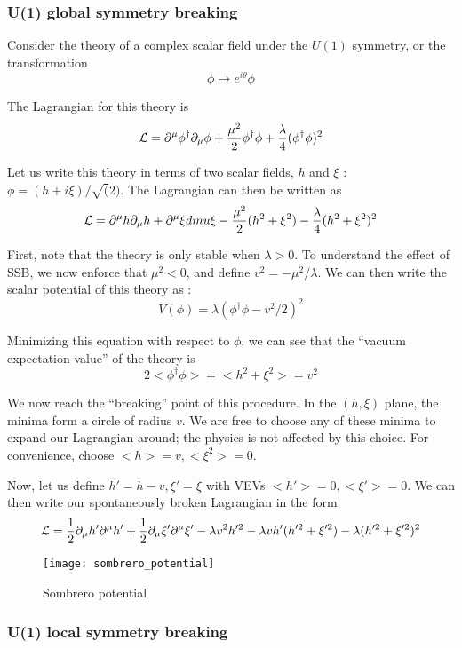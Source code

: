 \subsubsection{U(1) global symmetry breaking}

Consider the theory of a complex scalar field under the $U(1)$ symmetry, or the transformation
\begin{equation}
\phi \rightarrow e^{i\theta} \phi
\end{equation}

The Lagrangian for this theory is
\begin{equation}
\mathcal{L} = \partial^\mu \phi^{\dag} \partial_\mu \phi + \frac{\mu^2}{2} \phi^{\dag} \phi + \frac{\lambda}{4} (\phi^\dag \phi)^2
\end{equation}

Let us write this theory in terms of two scalar fields, $h$ and $\xi$ : $\phi = (h + i\xi) / \sqrt(2)$.
The Lagrangian can then be written as
\begin{equation}
\mathcal{L} = \partial^\mu h \partial_\mu h + \partial^\mu \xi dmu \xi - \frac{\mu^2}{2} (h^2 + \xi^2) - \frac{\lambda}{4}(h^2 + \xi^2)^2
\end{equation}

First, note that the theory is only stable when $\lambda > 0$.
To understand the effect of SSB, we now enforce that $\mu^2 < 0$, and define $v^2 = -\mu^2/\lambda$.
We can then write the scalar potential of this theory as :
\begin{equation}
V(\phi) = \lambda (\phi^\dag \phi - v^2/2)^2
\end{equation}

Minimizing this equation with respect to $\phi$, we can see that the ``vacuum expectation value'' of the theory is
\begin{equation}
2<\phi^\dag \phi> = <h^2 + \xi^2 > = v^2
\end{equation}

We now reach the ``breaking'' point of this procedure.
In the $(h, \xi)$ plane, the minima form a circle of radius $v$.
We are free to choose any of these minima to expand our Lagrangian around; the physics is not affected by this choice.
For convenience, choose $<h> = v, <\xi^2> = 0$.

Now, let us define $h' = h - v , \xi' = \xi $ with VEVs $<h'> = 0 , <\xi'> = 0$.
We can then write our spontaneously broken Lagrangian in the form
\begin{equation}
\mathcal{L} = \frac{1}{2} \partial_\mu h' \partial^\mu h' +  \frac{1}{2} \partial_\mu \xi' \partial^\mu \xi' - \lambda v^2 h'^2 - \lambda v h' (h'^2 + \xi'^2 ) - \lambda (h'^2 + \xi'^2)^2
\end{equation}


\begin{figure} \label{fig:sombrero}
\caption{Sombrero potential}
\texttt{[image: sombrero\_potential]}
\end{figure}

\subsubsection{U(1) local  symmetry breaking}
